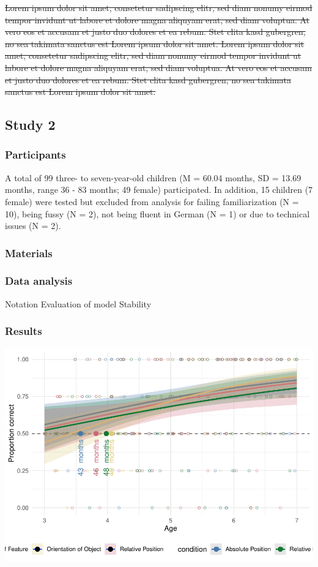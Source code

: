 \documentclass[
  man]{apa6}
\begin{document}
\st{Lorem ipsum dolor sit amet, consetetur sadipscing elitr, sed diam nonumy eirmod tempor invidunt ut labore et dolore magna aliquyam erat, sed diam voluptua. At vero eos et accusam et justo duo dolores et ea rebum. Stet clita kasd gubergren, no sea takimata sanctus est Lorem ipsum dolor sit amet. Lorem ipsum dolor sit amet, consetetur sadipscing elitr, sed diam nonumy eirmod tempor invidunt ut labore et dolore magna aliquyam erat, sed diam voluptua. At vero eos et accusam et justo duo dolores et ea rebum. Stet clita kasd gubergren, no sea takimata sanctus est Lorem ipsum dolor sit amet.}

\subsection{Study 2}\label{study-2}

\subsubsection{Participants}\label{participants-1}

A total of 99 three- to seven-year-old children (M = 60.04 months, SD = 13.69 months, range 36 - 83 months; 49 female) participated. In addition, 15 children (7 female) were tested but excluded from analysis for failing familiarization (N = 10), being fussy (N = 2), not being fluent in German (N = 1) or due to technical issues (N = 2).

\subsubsection{Materials}\label{materials}

\subsubsection{Data analysis}\label{data-analysis}

Notation
Evaluation of model Stability

\subsubsection{Results}\label{results-1}

\includegraphics{symlit_rep_manuscript_files/figure-latex/S2_bayes_plot-1.pdf}
\end{document}
